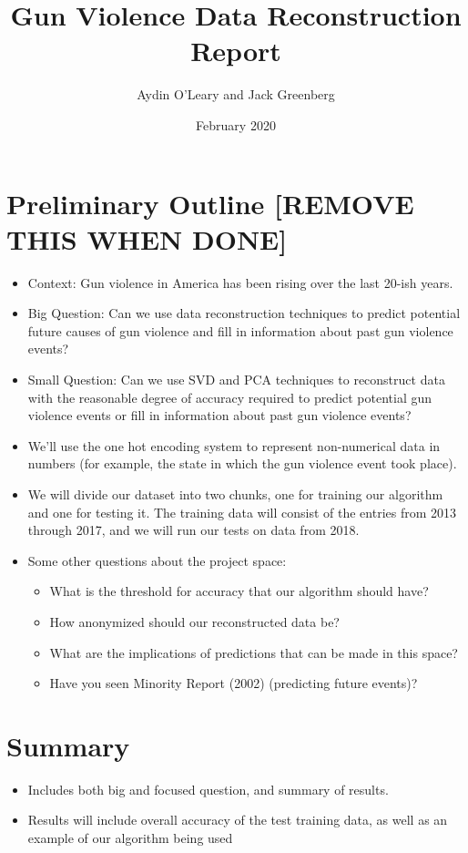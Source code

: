 \documentclass{article}
\title{Gun Violence Data Reconstruction Report}
\author{Aydin O'Leary and Jack Greenberg }
\date{February 2020}
\begin{document}
\maketitle

\section*{Preliminary Outline [REMOVE THIS WHEN DONE]}

\begin{itemize}
    \item Context: Gun violence in America has been rising over the last 20-ish years. \cite{website:cdc-data}
    \item Big Question: Can we use data reconstruction techniques to predict potential future causes of gun violence and fill in information about past gun violence events?
    \item Small Question: Can we use SVD and PCA techniques to reconstruct data with the reasonable degree of accuracy required to predict potential gun violence events or fill in information about past gun violence events?
    \item We'll use the one hot encoding system \cite{website:wikipedia_one-hot} to represent non-numerical data in numbers (for example, the state in which the gun violence event took place).
    \item We will divide our dataset into two chunks, one for training our algorithm and one for testing it. The training data will consist of the entries from 2013 through 2017, and we will run our tests on data from 2018.
    \item Some other questions about the project space: \begin{itemize}
        \item What is the threshold for accuracy that our algorithm should have?
        \item How anonymized should our reconstructed data be?
        \item What are the implications of predictions that can be made in this space?
        \item Have you seen Minority Report (2002) (predicting future events)?
    \end{itemize}
\end{itemize}

\section*{Summary}
    \begin{itemize}
        \item Includes both big and focused question, and summary of results.
        \item Results will include overall accuracy of the test training data, as well as an example of our algorithm being used
    \end{itemize}
\end{document}
